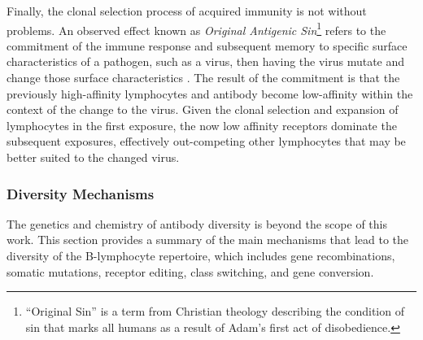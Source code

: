 Finally, the clonal selection process of acquired immunity is not without problems. An observed effect known as \emph{Original Antigenic Sin}\footnote{``Original Sin'' is a term from Christian theology describing the condition of sin that marks all humans as a result of Adam's first act of disobedience.} refers to the commitment of the immune response and subsequent memory to specific surface characteristics of a pathogen, such as a virus, then having the virus mutate and change those surface characteristics \cite{Francis1960, St.Groth1966}. The result of the commitment is that the previously high-affinity lymphocytes and antibody become low-affinity within the context of the change to the virus. Given the clonal selection and expansion of lymphocytes in the first exposure, the now low affinity receptors dominate the subsequent exposures, effectively out-competing other lymphocytes that may be better suited to the changed virus.

%
%
\subsubsection{Diversity Mechanisms}
\label{subsubsec:theory:diversity}
The genetics and chemistry of antibody diversity is beyond the scope of this work. This section provides a summary of the main mechanisms that lead to the diversity of the B-lymphocyte repertoire, which includes gene recombinations, somatic mutations, receptor editing, class switching, and gene conversion.

